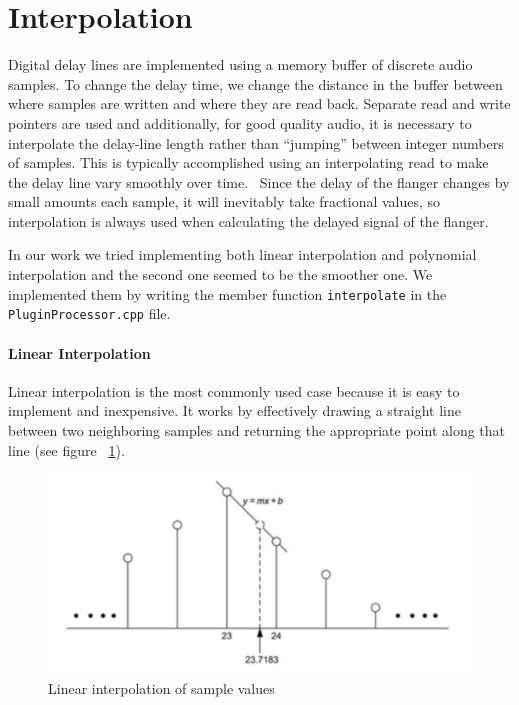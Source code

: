 \section{Interpolation}

Digital delay lines are implemented using a memory buffer of discrete audio samples. To change the delay time, we change the distance in the buffer between where samples are written and where they are read back.\cite{reiss2014audio}
Separate read and write pointers are used and additionally, for good quality audio, it is necessary to interpolate the delay-line length rather than ``jumping'' between integer numbers of samples. This is typically accomplished using an interpolating read to make the delay line vary smoothly over time.~\cite{smith2010physical}
Since the delay of the flanger changes by small amounts each sample, it will inevitably take fractional values, so interpolation is always used when calculating the delayed signal of the flanger.

In our work we tried implementing both linear interpolation and polynomial interpolation and the second one seemed to be the smoother one.
We implemented them by writing the member function \texttt{interpolate} in the \texttt{PluginProcessor.cpp} file.


\paragraph{Linear Interpolation}
Linear interpolation is the most commonly used case because it is easy to implement and inexpensive.
It works by effectively drawing a straight line between two neighboring samples and returning the appropriate point along that line (see figure ~\ref{fig:linear-interpolation}).
  
\begin{figure}[h]
	\centering
  	\includegraphics[width=0.8\linewidth]{assets/Linear interpolation of sample values.png}
  	\caption{Linear interpolation of sample values}
  	\label{fig:linear-interpolation}
\end{figure}

